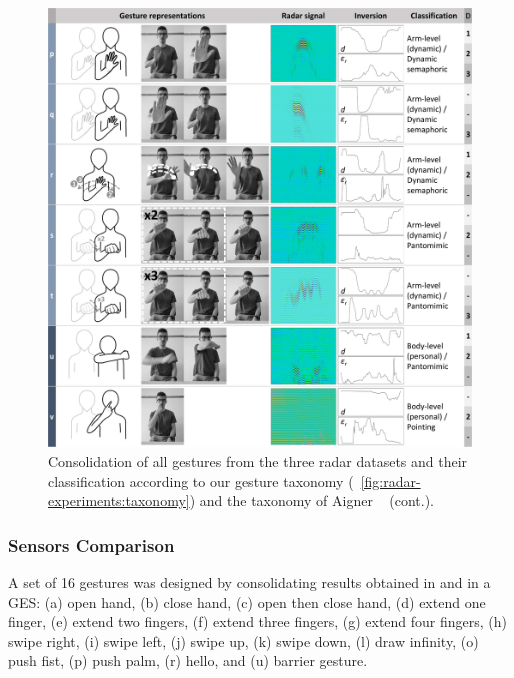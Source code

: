 \begin{figure}
    \centering
    \includegraphics[width=\linewidth]{Figures/RadarExperiments/Datasets/gesture-table-new-3.pdf}
    \caption{Consolidation of all gestures from the three radar datasets and their classification according to our gesture taxonomy (\fig~\ref{fig:radar-experiments:taxonomy}) and the taxonomy of Aigner \etal~\cite{Aigner:2012} (cont.).}
    \label{fig:radar-experiments:gestures-c}
    \vspace{-8pt}
\end{figure}

\subsubsection{Sensors Comparison} \label{sec:radar-experiments:data-collection:datasets:sensors}
A set of 16 gestures was designed by consolidating results obtained in \cite{Palipana:2021,Hayashi:2021,Lien:2016} and in a GES: (a) open hand, (b) close hand, (c) open then close hand, (d) extend one finger, (e) extend two fingers, (f) extend three fingers, (g) extend four fingers, (h) swipe right, (i) swipe left, (j) swipe up, (k) swipe down, (l) draw infinity, (o) push fist, (p) push palm, (r) hello, and (u) barrier gesture.

